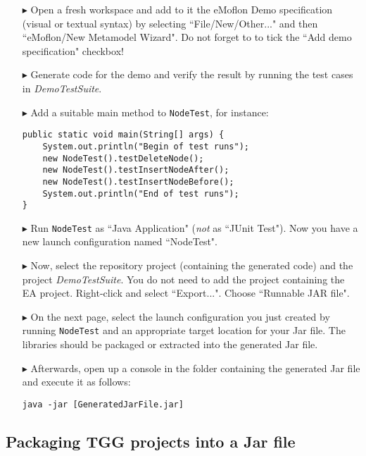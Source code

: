 \begin{itemize}
    
\item[$\blacktriangleright$] 
Open a fresh workspace and add to it the eMoflon Demo specification (visual or textual syntax) by selecting ``File/New/Other..." and then ``eMoflon/New Metamodel Wizard".
Do not forget to to tick the ``Add demo specification" checkbox!
    
\item[$\blacktriangleright$]
Generate code for the demo and verify the result by running the test cases in \emph{DemoTestSuite}.

\item[$\blacktriangleright$]
Add a suitable main method to \texttt{NodeTest}, for instance:
\begin{lstlisting}
public static void main(String[] args) {
    System.out.println("Begin of test runs");
    new NodeTest().testDeleteNode();
    new NodeTest().testInsertNodeAfter();
    new NodeTest().testInsertNodeBefore();
    System.out.println("End of test runs");
}
\end{lstlisting}

\item[$\blacktriangleright$]
Run \texttt{NodeTest} as ``Java Application" (\emph{not} as ``JUnit Test").
Now you have a new launch configuration named ``NodeTest".

\item[$\blacktriangleright$]
Now, select the repository project (containing the generated code) and the project \emph{DemoTestSuite}.
You do not need to add the project containing the EA project.
Right-click and select ``Export...".
Choose ``Runnable JAR file".
  
\item[$\blacktriangleright$]
On the next page, select the launch configuration you just created by running \texttt{NodeTest} and an appropriate target location for your Jar file.
The libraries should be packaged or extracted into the generated Jar file.

\item[$\blacktriangleright$]
Afterwards, open up a console in the folder containing the generated Jar file and execute it as follows:
\begin{lstlisting}
java -jar [GeneratedJarFile.jar]
\end{lstlisting}

    
\end{itemize}

\subsection{Packaging TGG projects into a Jar file}

